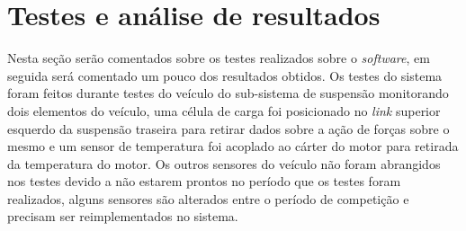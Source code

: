 \chapter{Testes e análise de resultados}
	\label{ch:testes}
Nesta seção serão comentados sobre os testes realizados sobre o \textit{software}, em seguida será comentado um pouco dos resultados obtidos. Os testes do sistema foram feitos durante testes do veículo do sub-sistema de suspensão monitorando dois elementos do veículo, uma célula de carga foi posicionado no \textit{link} superior esquerdo da suspensão traseira para retirar dados sobre a ação de forças sobre o mesmo e um sensor de temperatura foi acoplado ao cárter do motor para retirada da temperatura do motor. Os outros sensores do veículo não foram abrangidos nos testes devido a não estarem prontos no período que os testes foram realizados, alguns sensores são alterados entre o período de competição e precisam ser reimplementados no sistema. 

     